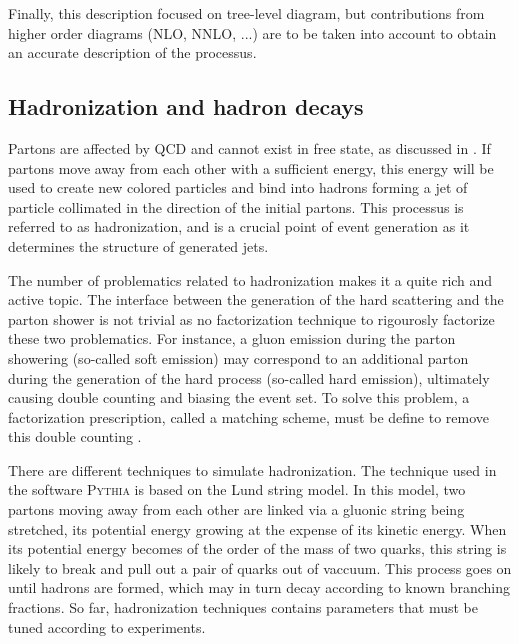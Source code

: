             Finally, this description focused on tree-level diagram, but contributions from
            higher order diagrams (NLO, NNLO, ...) are to be taken into account to obtain
            an accurate description of the processus.

            \subsection{Hadronization and hadron decays}

            Partons are affected by QCD and cannot exist in free state, as discussed in
            . If partons move away from each other
            with a sufficient energy, this energy will be used to create new colored
            particles and bind into hadrons forming a jet of particle collimated in the
            direction of the initial partons. This processus is referred to as hadronization,
            and is a crucial point of event generation as it determines the structure
            of generated jets.

            The number of problematics related to hadronization makes it a quite rich and
            active topic. The interface between the generation of the hard scattering
            and the parton shower is not trivial as no factorization technique to rigourosly
            factorize these two problematics. For instance, a gluon emission during
            the parton showering (so-called soft emission) may correspond to an additional
            parton during the generation of the hard process (so-called hard emission),
            ultimately causing double counting and biasing the event set. To solve this
            problem, a factorization prescription, called a matching scheme, must be define
            to remove this double counting .

            There are different techniques to simulate hadronization. The
            technique used in the software \textsc{Pythia} is based on the Lund string
            model. In this model, two partons moving away from each other are linked
            via a gluonic string being stretched, its potential energy growing at
            the expense of its kinetic energy. When its potential energy becomes of the
            order of the mass of two quarks, this string is likely to break and pull
            out a pair of quarks out of vaccuum. This process goes on until
            hadrons are formed, which may in turn decay according to known branching
            fractions. So far, hadronization techniques contains parameters that must
            be tuned according to experiments.

